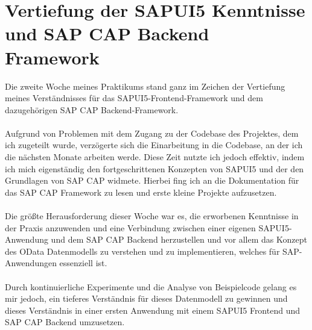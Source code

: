\section{Vertiefung der SAPUI5 Kenntnisse und SAP CAP Backend Framework}
Die zweite Woche meines Praktikums stand ganz im Zeichen der Vertiefung meines Verständnisses für das SAPUI5-Frontend-Framework und dem dazugehörigen SAP CAP Backend-Framework. \\\\
Aufgrund von Problemen mit dem Zugang zu der Codebase des Projektes, dem ich zugeteilt wurde, verzögerte sich die Einarbeitung in die Codebase, an der ich die nächsten Monate arbeiten werde. Diese Zeit nutzte ich jedoch effektiv, indem ich mich eigenständig den fortgeschrittenen Konzepten von SAPUI5 und der den Grundlagen von SAP CAP widmete. Hierbei fing ich an die Dokumentation für das SAP CAP Framework zu lesen und erste kleine Projekte aufzusetzen. \\\\
Die größte Herausforderung dieser Woche war es, die erworbenen Kenntnisse in der Praxis anzuwenden und eine Verbindung zwischen einer eigenen SAPUI5-Anwendung und dem SAP CAP Backend herzustellen und vor allem das Konzept des OData Datenmodells zu verstehen und zu implementieren, welches für SAP-Anwendungen essenziell ist. \\\\
Durch kontinuierliche Experimente und die Analyse von Beispielcode gelang es mir jedoch, ein tieferes Verständnis für dieses Datenmodell zu gewinnen und dieses Verständnis in einer ersten Anwendung mit einem SAPUI5 Frontend und SAP CAP Backend umzusetzen. \\\\

